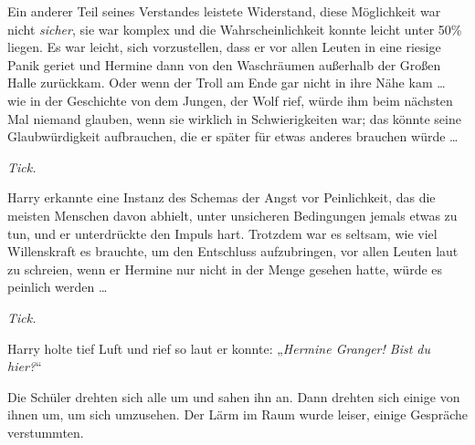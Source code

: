 Ein anderer Teil seines Verstandes leistete Widerstand, diese Möglichkeit war nicht \emph{sicher}, sie war komplex und die Wahrscheinlichkeit konnte leicht unter 50\% liegen. Es war leicht, sich vorzustellen, dass er vor allen Leuten in eine riesige Panik geriet und Hermine dann von den Waschräumen außerhalb der Großen Halle zurückkam. Oder wenn der Troll am Ende gar nicht in ihre Nähe kam … wie in der Geschichte von dem Jungen, der Wolf rief, würde ihm beim nächsten Mal niemand glauben, wenn sie wirklich in Schwierigkeiten war; das könnte seine Glaubwürdigkeit aufbrauchen, die er später für etwas anderes brauchen würde …

\emph{Tick.}

Harry erkannte eine Instanz des Schemas der Angst vor Peinlichkeit, das die meisten Menschen davon abhielt, unter unsicheren Bedingungen jemals etwas zu tun, und er unterdrückte den Impuls hart. Trotzdem war es seltsam, wie viel Willenskraft es brauchte, um den Entschluss aufzubringen, vor allen Leuten laut zu schreien, wenn er Hermine nur nicht in der Menge gesehen hatte, würde es peinlich werden …

\emph{Tick.}

Harry holte tief Luft und rief so laut er konnte:
„\emph{Hermine Granger! Bist du hier?}“

Die Schüler drehten sich alle um und sahen ihn an. Dann drehten sich einige von ihnen um, um sich umzusehen. Der Lärm im Raum wurde leiser, einige Gespräche verstummten.

